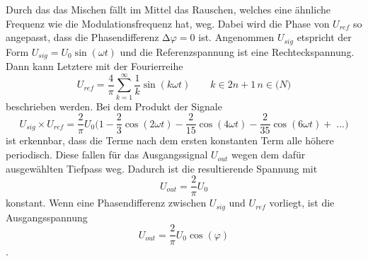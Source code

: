 Durch das das Mischen fällt im Mittel das Rauschen, welches eine ähnliche Frequenz wie die Modulationsfrequenz hat, weg.
Dabei wird die Phase von $U_{ref}$ so angepasst, dass die Phasendifferenz $\increment \varphi=0$ ist.
Angenommen $U_{sig}$ etspricht der Form $U_{sig}=U_0 \sin(\omega t)$ und die Referenzspannung ist eine Rechteckspannung.
Dann kann Letztere mit der Fourierreihe 
\begin{equation}
    U_{ref}=\frac{4}{\pi} \sum_{k=1}^\infty \frac{1}{k}\sin(k\omega t) \qquad k \in 2n+1 \, n \in \mathbb(N)
    \label{eqn:Fourier}
\end{equation}
beschrieben werden.
Bei dem Produkt der Signale 
\begin{equation}
    U_{sig} \times U_{ref}=\frac{2}{\pi}U_0 \biggl(1-\frac{2}{3}\cos(2\omega t)-\frac{2}{15}\cos(4\omega t)- \frac{2}{35}\cos(6 \omega t)+ \; ...\biggr)
    \label{eqn:Produkt}
\end{equation}
ist erkennbar, dass die Terme nach dem ersten konstanten Term alle höhere periodisch.
Diese fallen für das Ausgangssignal $U_{out}$ wegen dem dafür ausgewählten Tiefpass weg.
Dadurch ist die resultierende Spannung mit
\begin{equation}
    U_{out}=\frac{2}{\pi}U_0
    \label{eqn:konst}
\end{equation}
konstant.
Wenn eine Phasendifferenz zwischen $U_{sig}$ und $U_{ref}$ vorliegt, ist die Ausgangsspannung 
\begin{equation}
    U_{out}=\frac{2}{\pi}U_0 \cos(\varphi)
    \label{eqn:cos}
\end{equation}.
